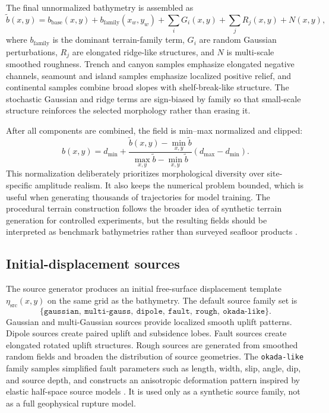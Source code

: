 The final unnormalized bathymetry is assembled as
\[
\tilde{b}(x,y)=b_{\mathrm{base}}(x,y)
+b_{\mathrm{family}}(x_w,y_w)
+\sum_i G_i(x,y)
+\sum_j R_j(x,y)
+N(x,y),
\]
where $b_{\mathrm{family}}$ is the dominant terrain-family term, $G_i$ are random Gaussian perturbations, $R_j$ are elongated ridge-like structures, and $N$ is multi-scale smoothed roughness. Trench and canyon samples emphasize elongated negative channels, seamount and island samples emphasize localized positive relief, and continental samples combine broad slopes with shelf-break-like structure. The stochastic Gaussian and ridge terms are sign-biased by family so that small-scale structure reinforces the selected morphology rather than erasing it.

After all components are combined, the field is min--max normalized and clipped:
\[
b(x,y)=d_{\min}
+\frac{\tilde{b}(x,y)-\min_{x,y}\tilde{b}}{\max_{x,y}\tilde{b}-\min_{x,y}\tilde{b}}
(d_{\max}-d_{\min}).
\]
This normalization deliberately prioritizes morphological diversity over site-specific amplitude realism. It also keeps the numerical problem bounded, which is useful when generating thousands of trajectories for model training. The procedural terrain construction follows the broader idea of synthetic terrain generation for controlled experiments, but the resulting fields should be interpreted as benchmark bathymetries rather than surveyed seafloor products \citep{musgrave1989terrain,sandwell2014gravity}.

\subsection{Initial-displacement sources}
\label{subsec:initial-displacement-sources}

The source generator produces an initial free-surface displacement template $\eta_{\mathrm{src}}(x,y)$ on the same grid as the bathymetry. The default source family set is
\[
\{\texttt{gaussian},\ \texttt{multi-gauss},\ \texttt{dipole},\ \texttt{fault},\ \texttt{rough},\ \texttt{okada-like}\}.
\]
Gaussian and multi-Gaussian sources provide localized smooth uplift patterns. Dipole sources create paired uplift and subsidence lobes. Fault sources create elongated rotated uplift structures. Rough sources are generated from smoothed random fields and broaden the distribution of source geometries. The \texttt{okada-like} family samples simplified fault parameters such as length, width, slip, angle, dip, and source depth, and constructs an anisotropic deformation pattern inspired by elastic half-space source models \citep{okada1985surface}. It is used only as a synthetic source family, not as a full geophysical rupture model.

